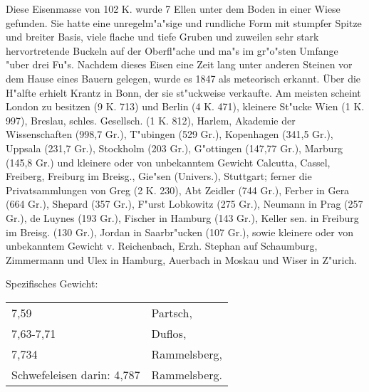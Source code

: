 \documentclass[a4paper, 11pt, oneside]{article}
\begin{document}
Diese Eisenmasse von 102 K. wurde 7 Ellen unter dem Boden in einer Wiese gefunden. Sie hatte eine unregelm"a"sige und rundliche Form mit stumpfer Spitze und breiter Basis, viele flache und tiefe Gruben und zuweilen sehr stark hervortretende Buckeln auf der Oberfl"ache und ma"s im gr"o"sten Umfange "uber drei Fu"s. Nachdem dieses Eisen eine Zeit lang unter anderen Steinen vor dem Hause eines Bauern gelegen, wurde es 1847 als meteorisch erkannt. Über die H"alfte erhielt Krantz in Bonn, der sie st"uckweise verkaufte. Am meisten scheint London zu besitzen (9 K. 713) und Berlin (4 K. 471), kleinere St"ucke Wien (1 K. 997), Breslau, schles. Gesellsch. (1 K. 812), Harlem, Akademie der Wissenschaften (998,7 Gr.), T"ubingen (529 Gr.), Kopenhagen (341,5 Gr.), Uppsala (231,7 Gr.), Stockholm (203 Gr.), G"ottingen (147,77 Gr.), Marburg (145,8 Gr.) und kleinere oder von unbekanntem Gewicht Calcutta, Cassel, Freiberg, Freiburg im Breisg., Gie"sen (Univers.), Stuttgart; ferner die Privatsammlungen von Greg (2 K. 230), Abt Zeidler (744 Gr.), Ferber in Gera (664 Gr.), Shepard (357 Gr.), F"urst Lobkowitz (275 Gr.), Neumann in Prag (257 Gr.), de Luynes (193 Gr.), Fischer in Hamburg (143 Gr.), Keller sen. in Freiburg im Breisg. (130 Gr.), Jordan in Saarbr"ucken (107 Gr.), sowie kleinere oder von unbekanntem Gewicht v. Reichenbach, Erzh. Stephan auf Schaumburg, Zimmermann und Ulex in Hamburg, Auerbach in Moskau und Wiser in Z"urich.

Spezifisches Gewicht:  
\begin{table}[!ht]
    \centering\swabfamily\Large
    \begin{tabular}{l l}
        7,59 & Partsch,\\
        7,63-7,71 & Duflos,\\
        7,734 & Rammelsberg,\\
        Schwefeleisen darin: 4,787 & Rammelsberg.
    \end{tabular}
\end{table}
\end{document}
